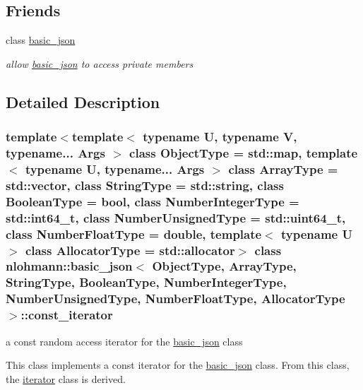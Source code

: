 \subsection*{Friends}
\begin{DoxyCompactItemize}
\item 
\mbox{\label{classnlohmann_1_1basic__json_1_1const__iterator_ada3100cdb8700566051828f1355fa745}} 
class \hyperlink{classnlohmann_1_1basic__json_1_1const__iterator_ada3100cdb8700566051828f1355fa745}{basic\+\_\+json}
\begin{DoxyCompactList}\small\item\em allow \hyperlink{classnlohmann_1_1basic__json}{basic\+\_\+json} to access private members \end{DoxyCompactList}\end{DoxyCompactItemize}


\subsection{Detailed Description}
\subsubsection*{template$<$template$<$ typename U, typename V, typename... Args $>$ class Object\+Type = std\+::map, template$<$ typename U, typename... Args $>$ class Array\+Type = std\+::vector, class String\+Type = std\+::string, class Boolean\+Type = bool, class Number\+Integer\+Type = std\+::int64\+\_\+t, class Number\+Unsigned\+Type = std\+::uint64\+\_\+t, class Number\+Float\+Type = double, template$<$ typename U $>$ class Allocator\+Type = std\+::allocator$>$\newline
class nlohmann\+::basic\+\_\+json$<$ Object\+Type, Array\+Type, String\+Type, Boolean\+Type, Number\+Integer\+Type, Number\+Unsigned\+Type, Number\+Float\+Type, Allocator\+Type $>$\+::const\+\_\+iterator}

a const random access iterator for the \hyperlink{classnlohmann_1_1basic__json}{basic\+\_\+json} class 

This class implements a const iterator for the \hyperlink{classnlohmann_1_1basic__json}{basic\+\_\+json} class. From this class, the \hyperlink{classnlohmann_1_1basic__json_1_1iterator}{iterator} class is derived.

